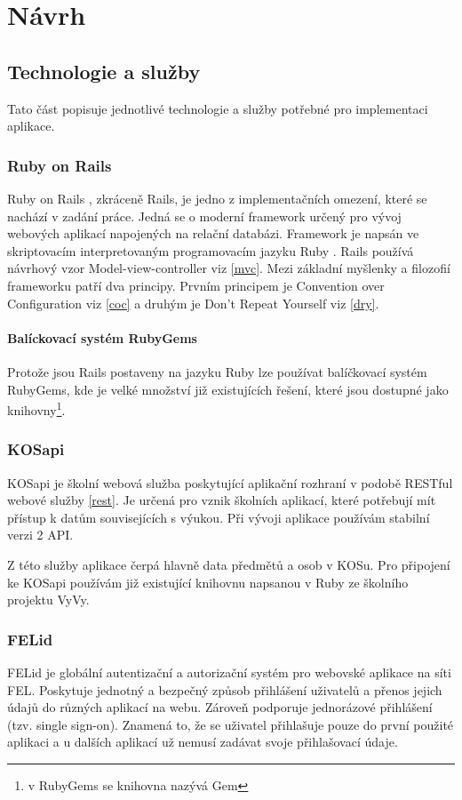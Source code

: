 \chapter{Návrh}

\section{Technologie a služby}
Tato část popisuje jednotlivé technologie a služby potřebné pro implementaci aplikace.

\subsection{Ruby on Rails}
Ruby on Rails \cite{rubyonrails}, zkráceně Rails, je jedno z implementačních omezení, které se nachází v zadání práce. Jedná se o moderní framework určený pro vývoj webových aplikací napojených na relační databázi. Framework je napsán ve skriptovacím interpretovaným programovacím jazyku Ruby \cite{ruby}. Rails používá návrhový vzor Model-view-controller viz \ref{mvc}. Mezi základní myšlenky a filozofií frameworku patří dva principy. Prvním principem je Convention over Configuration viz \ref{coc} a druhým je Don’t Repeat Yourself viz \ref{dry}.

\subsubsection{Balíckovací systém RubyGems}
Protože jsou Rails postaveny na jazyku Ruby lze používat balíčkovací systém RubyGems, kde je velké množství již existujících řešení, které jsou dostupné jako knihovny\footnote{v RubyGems se knihovna nazývá Gem}. 

\subsection{KOSapi}
\label{kosapi}
KOSapi je školní webová služba poskytující aplikační rozhraní v podobě RESTful webové služby \ref{rest}. Je určená pro vznik školních aplikací, které potřebují mít přístup k datům souvisejících s výukou. Při vývoji aplikace používám stabilní verzi 2 API. 

Z této služby aplikace čerpá hlavně data předmětů a osob v KOSu. Pro připojení ke KOSapi používám již existující knihovnu napsanou v Ruby ze školního projektu VyVy\cite{vyvy_project}.  

\subsection{FELid}
\label{felid}
FELid \cite{felid} je globální autentizační a autorizační systém pro webovské aplikace na síti FEL. Poskytuje jednotný a bezpečný způsob přihlášení uživatelů a přenos jejich údajů do různých aplikací na webu. Zároveň podporuje jednorázové přihlášení (tzv. single sign-on). Znamená to, že se uživatel přihlašuje pouze do první použité aplikaci a u dalších aplikací už nemusí zadávat svoje přihlašovací údaje.


